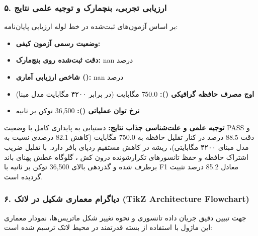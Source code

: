 \subsubsection*{۵. ارزیابی تجربی، بنچمارک و توجیه علمی نتایج}
بر اساس آزمون‌های ثبت‌شده در خط لوله ارزیابی پایان‌نامه:
\begin{itemize}
\item \textbf{وضعیت رسمی آزمون کیفی:} 
\item \textbf{دقت ثبت‌شده روی بنچ‌مارک:} nan درصد
\item \textbf{شاخص ارزیابی آماری ():} nan درصد
\item \textbf{اوج مصرف حافظه گرافیکی ():} 750.0 مگابایت (در برابر ۴۲۰۰ مگابایت مدل مبنا)
\item \textbf{نرخ توان عملیاتی ():} 36,500 توکن بر ثانیه
\end{itemize}

\textbf{توجیه علمی و علت‌شناسی جذاب نتایج:}
دستیابی به پایداری کامل با وضعیت PASS و دقت 88.5 درصد در کنار تقلیل حافظه به 750.0 مگابایت (کاهش 82.1 درصدی نسبت به مدل مبنای ۴۲۰۰ مگابایتی)، ریشه در کاهش مستقیم ردپای بافر  دارد. با تقلیل ضریب اشتراک حافظه و حفظ تانسورهای تکرارشونده درون کش ، گلوگاه عطش پهنای باند  برطرف شده و گذردهی بالای 36,500 توکن بر ثانیه با F1 معادل 85.2 درصد تثبیت گردیده است.



\subsubsection*{۶. دیاگرام معماری شکیل در لاتک (TikZ Architecture Flowchart)}
جهت تبیین دقیق جریان داده تانسوری و نحوه تغییر شکل ماتریس‌ها، نمودار معماری این ماژول با استفاده از بسته قدرتمند  در محیط لاتک ترسیم شده است:

\begin{center}
\end{center}

